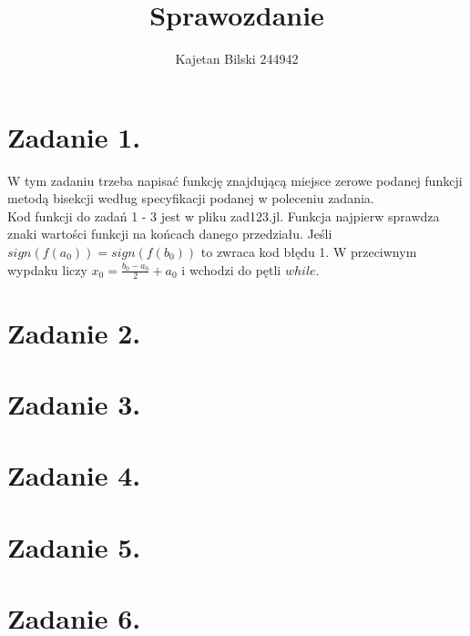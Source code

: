 \documentclass{article}
\title{Sprawozdanie}
\author{Kajetan Bilski 244942}
\begin{document}
	\maketitle

\section{Zadanie 1.}
W tym zadaniu trzeba napisać funkcję znajdującą miejsce zerowe podanej funkcji metodą bisekcji według specyfikacji podanej w poleceniu zadania.\\
Kod funkcji do zadań 1 - 3 jest w pliku zad123.jl.
Funkcja najpierw sprawdza znaki wartości funkcji na końcach danego przedziału. Jeśli $sign(f(a_{0})) = sign(f(b_{0}))$ to zwraca kod błędu 1. W przeciwnym wypdaku liczy $x_{0}=\frac{b_{0}-a_{0}}{2}+a_{0}$ i wchodzi do pętli $while$.
\section{Zadanie 2.}

\section{Zadanie 3.}

\section{Zadanie 4.}

\section{Zadanie 5.}

\section{Zadanie 6.}
\end{document}
